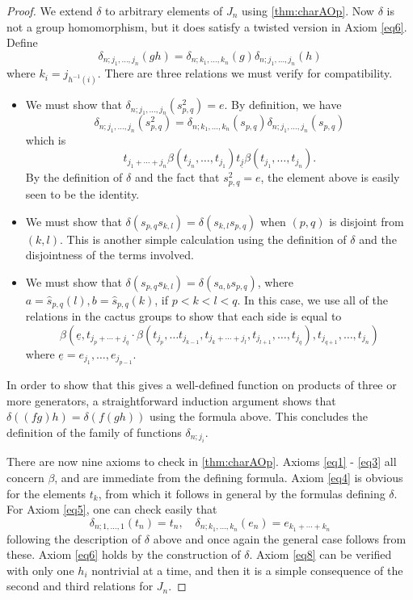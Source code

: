 \begin{proof}
We extend $\delta$ to arbitrary elements of $J_n$ using \cref{thm:charAOp}. 
Now $\delta$ is not a group homomorphism, but it does satisfy a twisted version in Axiom \eqref{eq6}.
Define
  \[
    \delta_{n; j_1,\ldots,j_n}(gh) = \delta_{n; k_1,\ldots,k_n}(g)\delta_{n; j_1,\ldots,j_n}(h)
  \]
where $k_{i} = j_{h^{-1}(i)}$. There are three relations we must verify for compatibility.
\begin{itemize}
\item We must show that $\delta_{n; j_1,\ldots,j_n}\left(s_{p,q}^{2}\right) = e$. By definition, we have
  \[
    \delta_{n; j_1,\ldots,j_n}\left(s_{p,q}^{2}\right) = \delta_{n; k_1,\ldots,k_n}\left(s_{p,q}\right)\delta_{n; j_1,\ldots,j_n}\left(s_{p,q}\right)
  \]
which is
  \[
    t_{j_1 + \cdots + j_n}\beta(t_{j_{n}}, \ldots, t_{j_{1}}) t_{\underline{j}} \beta(t_{j_{1}}, \ldots, t_{j_{n}}).
  \]
By the definition of $\delta$ and the fact that $s_{p,q}^{2}=e$, the element above is easily seen to be the identity.
\item We must show that $\delta(s_{p,q}s_{k,l}) = \delta(s_{k,l}s_{p,q})$ when $(p,q)$ is disjoint from $(k,l)$. This is another simple calculation using the definition of $\delta$ and the disjointness of the terms involved.
\item We must show that $\delta(s_{p,q}s_{k,l}) = \delta(s_{a,b}s_{p,q})$,  where $a = \hat{s}_{p,q}(l), b = \hat{s}_{p,q}(k)$, if $p < k < l < q$. In this case, we use all of the relations in the cactus groups to show that each side is equal to
  \[
    \beta\left(\underline{e}, t_{j_{p}+\cdots + j_{q}} \cdot \beta \left(t_{j_{p}}, \ldots t_{j_{k-1}}, t_{j_{k}+ \cdots +j_{l}}, t_{j_{l+1}}, \ldots, t_{j_{q}}\right), t_{j_{q+1}}, \ldots, t_{j_{n}}\right)
  \]
where $\underline{e} = e_{j_{1}}, \ldots, e_{j_{p-1}}$.
\end{itemize}
In order to show that this gives a well-defined function on products of three or more generators, a straightforward induction argument shows that $\delta\left((fg)h\right) = \delta\left(f(gh)\right)$ using the formula above. This concludes the definition of the family of functions $\delta_{n; j_{i}}$.

There are now nine axioms to check in \cref{thm:charAOp}. Axioms \eqref{eq1} - \eqref{eq3} all concern $\beta$, and are immediate from the defining formula. Axiom \eqref{eq4} is obvious for the elements $t_{k}$, from which it follows in general by the formulas defining $\delta$. For Axiom \eqref{eq5}, one can check easily that
  \[
    \delta_{n; 1, \ldots, 1}(t_{n}) = t_{n}, \quad \delta_{n;k_1,\ldots,k_n}(e_n) = e_{k_1 + \cdots + k_n}
  \]
following the description of $\delta$ above and once again the general case follows from these. Axiom \eqref{eq6} holds by the construction of $\delta$. Axiom \eqref{eq8} can be verified with only one $h_{i}$ nontrivial at a time, and then it is a simple consequence of the second and third relations for $J_{n}$.


\end{proof}
